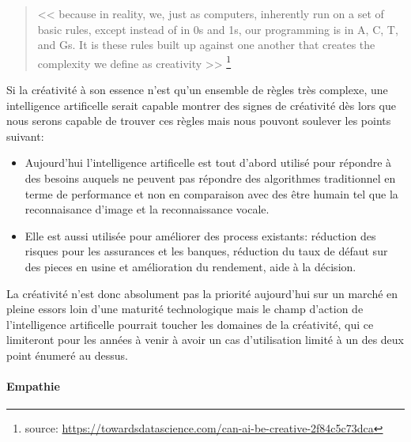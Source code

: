         \begin{quote}
            << because in reality, we, just as computers, inherently run on a set of basic rules, 
            except instead of in 0s and 1s, our programming is in A, C, T, and Gs.
            It is these rules built up against one another that creates the complexity 
            we define as creativity >>
            \footnote{source: \url{https://towardsdatascience.com/can-ai-be-creative-2f84c5c73dca}}
            \newline
        \end{quote}

        Si la créativité à son essence n'est qu'un ensemble de règles très complexe, 
        une intelligence artificelle serait capable montrer des signes de créativité 
        dès lors que nous serons capable de trouver ces règles mais nous 
        pouvont soulever les points suivant: \newline

        \begin{itemize}
            \item Aujourd'hui l'intelligence artificelle 
            est tout d'abord utilisé pour répondre à des besoins auquels ne peuvent pas 
            répondre des algorithmes traditionnel en terme de performance et non 
            en comparaison avec des être humain tel que la reconnaisance d'image et
            la reconnaissance vocale.
            \newline

            \item Elle est aussi utilisée pour améliorer des process existants:
            réduction des risques pour les assurances et les banques, réduction
            du taux de défaut sur des pieces en usine et amélioration du rendement,
            aide à la décision.
            \newline
        \end{itemize}

        La créativité n'est donc absolument pas la priorité aujourd'hui sur un marché 
        en pleine essors loin d'une maturité technologique mais le champ d'action 
        de l'intelligence artificelle pourrait toucher les domaines de la créativité,
        qui ce limiteront pour les années à venir à avoir un cas d'utilisation limité 
        à un des deux point énumeré au dessus. 
        \newline 

        \newpage
        \paragraph{Empathie} 

